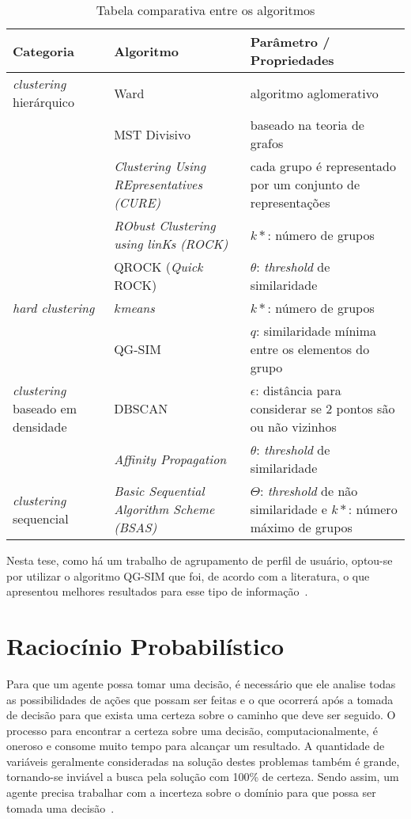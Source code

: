 \begin{table}[h!]
	\caption{Tabela comparativa entre os algoritmos}
	\label{tab:comp_algo_agrupamento}
	\begin{tabular}{ m{2.8cm} | m{5cm} | m{7cm} } \hline
	Categoria & Algoritmo & Parâmetro / Propriedades \\ \hline
	\emph{clustering} hierárquico & Ward & algoritmo aglomerativo \\ \hline
	& MST Divisivo & baseado na teoria de grafos \\ \hline
	& \emph{Clustering Using REpresentatives (CURE)} & cada grupo é representado por um conjunto de representações \\ \hline
	& \emph{RObust Clustering using linKs (ROCK)} & $k*$: número de grupos \\ \hline
	& QROCK (\emph{Quick} ROCK) & $\theta$: \emph{threshold} de similaridade  \\ \hline
	\emph{hard clustering} & $k$\emph{means} & $k*$: número de grupos \\ \hline
    & QG-SIM & $q$: similaridade mínima entre os elementos do grupo \\ \hline
	\emph{clustering} baseado em densidade & DBSCAN & $\epsilon$: distância para considerar se 2 pontos são ou não vizinhos \\ \hline
	& \emph{Affinity Propagation} & $\theta$: \emph{threshold} de similaridade  \\ \hline
	\emph{clustering} sequencial & \emph{Basic Sequential Algorithm Scheme (BSAS)} & $\Theta$: \emph{threshold} de não similaridade e $k*$: número máximo de grupos  \\ \hline
	\end{tabular}
\end{table}

Nesta tese, como há um trabalho de agrupamento de perfil de usuário, optou-se por utilizar o algoritmo QG-SIM que foi, de acordo com a literatura, o que apresentou melhores resultados para esse tipo de informação~\cite{masiero:2013}.

\section{Raciocínio Probabilístico}
\label{sec:raciocinio-probabilistico}
Para que um agente possa tomar uma decisão, é necessário que ele analise todas as possibilidades de ações que possam ser feitas e o que ocorrerá após a tomada de decisão para que exista uma certeza sobre o caminho que deve ser seguido. O processo para encontrar a certeza sobre uma decisão, computacionalmente, é oneroso e consome muito tempo para alcançar um resultado. A quantidade de variáveis geralmente consideradas na solução destes problemas também é grande, tornando-se inviável a busca pela solução com 100\% de certeza. Sendo assim, um agente precisa trabalhar com a incerteza sobre o domínio para que possa ser tomada uma decisão~\cite{russell:2002}.

